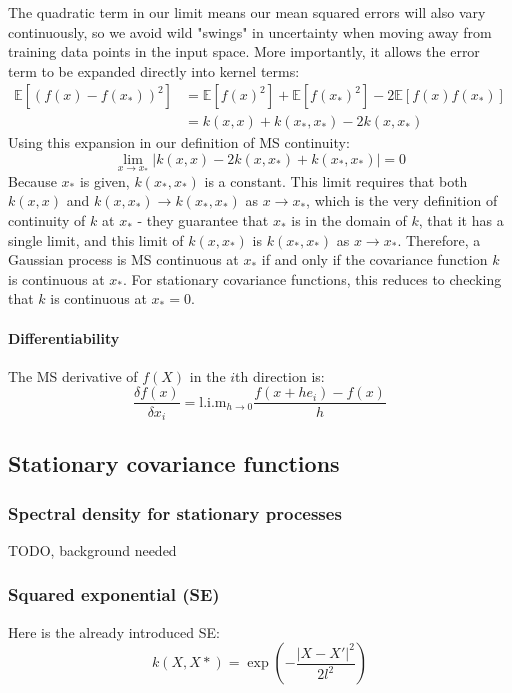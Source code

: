 The quadratic term in our limit means our mean squared errors will also vary continuously, so we avoid wild "swings" in uncertainty when moving away from training data points in the input space. More importantly, it allows the error term to be expanded directly into kernel terms: 
\begin{equation*}
    \begin{aligned}
        \mathbb{E}[(f(x) - f(x_*))^2] &= \mathbb{E}[f(x)^2] + \mathbb{E}[f(x_*)^2] - 2\mathbb{E}[f(x)f(x_*)] \\
        &= k(x, x) + k(x_*, x_*) - 2k(x, x_*)
    \end{aligned}
\end{equation*}
Using this expansion in our definition of MS continuity: 
\begin{equation*}
    \lim_{x \to x_*} | k(x, x) - 2k(x, x_*) + k(x_*, x_*) | = 0
\end{equation*}
Because $x_*$ is given, $k(x_*, x_*)$ is a constant. This limit requires that both $k(x, x)$ and $k(x, x_*) \to k(x_*, x_*)$ as $x \to x_*$, which is the very definition of continuity of $k$ at $x_*$ - they guarantee that $x_*$ is in the domain of $k$, that it has a single limit, and this limit of $k(x, x_*)$ is $k(x_*, x_*)$ as $x \to x_*$. Therefore, a Gaussian process is MS continuous at $x_*$ if and only if the covariance function $k$ is continuous at $x_*$. For stationary covariance functions, this reduces to checking that $k$ is continuous at $x_* = 0$.

\paragraph{Differentiability}
The MS derivative of $f(X)$ in the $i$th direction is:
\begin{equation*}
    \frac{\delta f(x)}{\delta x_i} = \text{l.i.m}_{h \to 0} \frac{f(x + h e_i) - f(x)}{h}
\end{equation*}

\subsection{Stationary covariance functions \cite{gp-ml}}

\subsubsection{Spectral density for stationary processes}
TODO, background needed

\subsubsection{Squared exponential (SE)}
Here is the already introduced SE:
\begin{equation*}
    k(X,X*) = \exp \left(- \frac{|X - X'|^2}{2l^2} \right)
\end{equation*}

